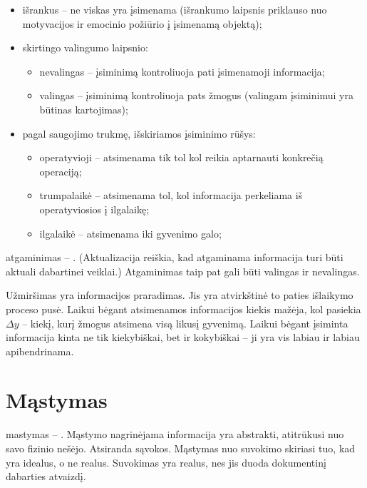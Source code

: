 \begin{itemize}
  \item išrankus – ne viskas yra įsimenama (išrankumo laipsnis 
    priklauso nuo motyvacijos ir emocinio požiūrio į įsimenamą objektą);
  \item skirtingo valingumo laipsnio:
    \begin{itemize}
      \item nevalingas – įsiminimą kontroliuoja pati įsimenamoji 
        informacija;
      \item valingas – įsiminimą kontroliuoja pats žmogus (valingam
        įsiminimui yra būtinas kartojimas);
    \end{itemize}
  \item pagal saugojimo trukmę, išskiriamos įsiminimo rūšys:
    \begin{itemize}
      \item operatyvioji – atsimenama tik tol kol reikia aptarnauti 
        konkrečią operaciją;
      \item trumpalaikė – atsimenama tol, kol informacija perkeliama iš
        operatyviosios į ilgalaikę;
      \item ilgalaikė – atsimenama iki gyvenimo galo;
    \end{itemize}
\end{itemize}

\Gls{atgaminimas} – . (Aktualizacija reiškia, kad
atgaminama informacija turi būti aktuali dabartinei veiklai.) Atgaminimas
taip pat gali būti valingas ir nevalingas.

Užmiršimas yra informacijos praradimas. Jis yra atvirkštinė to paties 
išlaikymo proceso pusė. Laikui bėgant atsimenamos informacijos kiekis
mažėja, kol pasiekia $\Delta y$ – kiekį, kurį žmogus atsimena visą likusį
gyvenimą. Laikui bėgant įsiminta informacija kinta ne tik kiekybiškai, bet
ir kokybiškai – ji yra vis labiau ir labiau apibendrinama.

\section{Mąstymas}

\label{tema:mastymas}

\Gls{mastymas} – . Mąstymo nagrinėjama informacija 
yra abstrakti, atitrūkusi nuo savo fizinio nešėjo. Atsiranda sąvokos.
Mąstymas nuo suvokimo skiriasi tuo, kad yra idealus, o ne realus. Suvokimas
yra realus, nes jis duoda dokumentinį dabarties atvaizdį.

